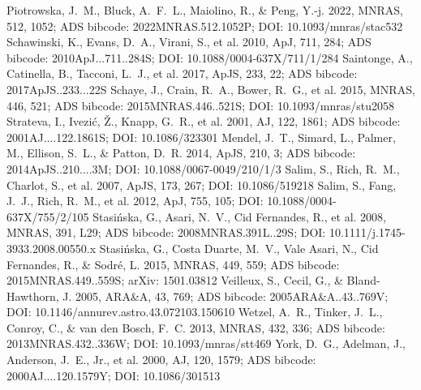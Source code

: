 \documentclass[twocolumn]{aastex631}
\begin{document}
\begin{thebibliography}{}
 Piotrowska, J.~M., Bluck, A.~F.~L., Maiolino, R., \& Peng, Y.-j. 2022, MNRAS, 512, 1052; ADS bibcode: 2022MNRAS.512.1052P; DOI: 10.1093/mnras/stac532
 Schawinski, K., Evans, D.~A., Virani, S., et al. 2010, ApJ, 711, 284; ADS bibcode: 2010ApJ...711..284S; DOI: 10.1088/0004-637X/711/1/284
 Saintonge, A., Catinella, B., Tacconi, L.~J., et al. 2017, ApJS, 233, 22; ADS bibcode: 2017ApJS..233...22S
 Schaye, J., Crain, R.~A., Bower, R.~G., et al. 2015, MNRAS, 446, 521; ADS bibcode: 2015MNRAS.446..521S; DOI: 10.1093/mnras/stu2058
 Strateva, I., Ivezi{\'c}, {\v Z}., Knapp, G.~R., et al. 2001, AJ, 122, 1861; ADS bibcode: 2001AJ....122.1861S; DOI: 10.1086/323301
 Mendel, J.~T., Simard, L., Palmer, M., Ellison, S.~L., \& Patton, D.~R. 2014, ApJS, 210, 3; ADS bibcode: 2014ApJS..210....3M; DOI: 10.1088/0067-0049/210/1/3
 Salim, S., Rich, R.~M., Charlot, S., et al. 2007, ApJS, 173, 267; DOI: 10.1086/519218
 Salim, S., Fang, J.~J., Rich, R.~M., et al. 2012, ApJ, 755, 105; DOI: 10.1088/0004-637X/755/2/105
 Stasi{\'n}ska, G., Asari, N.~V., Cid Fernandes, R., et al. 2008, MNRAS, 391, L29; ADS bibcode: 2008MNRAS.391L..29S; DOI: 10.1111/j.1745-3933.2008.00550.x
 Stasi{\'n}ska, G., Costa Duarte, M.~V., Vale Asari, N., Cid Fernandes, R., \& Sodr{\'e}, L. 2015, MNRAS, 449, 559; ADS bibcode: 2015MNRAS.449..559S; arXiv: 1501.03812
 Veilleux, S., Cecil, G., \& Bland-Hawthorn, J. 2005, ARA\&A, 43, 769; ADS bibcode: 2005ARA&A..43..769V; DOI: 10.1146/annurev.astro.43.072103.150610
 Wetzel, A.~R., Tinker, J.~L., Conroy, C., \& van den Bosch, F.~C. 2013, MNRAS, 432, 336; ADS bibcode: 2013MNRAS.432..336W; DOI: 10.1093/mnras/stt469
 York, D.~G., Adelman, J., Anderson, J.~E., Jr., et al. 2000, AJ, 120, 1579; ADS bibcode: 2000AJ....120.1579Y; DOI: 10.1086/301513
\end{thebibliography}
\end{document}
